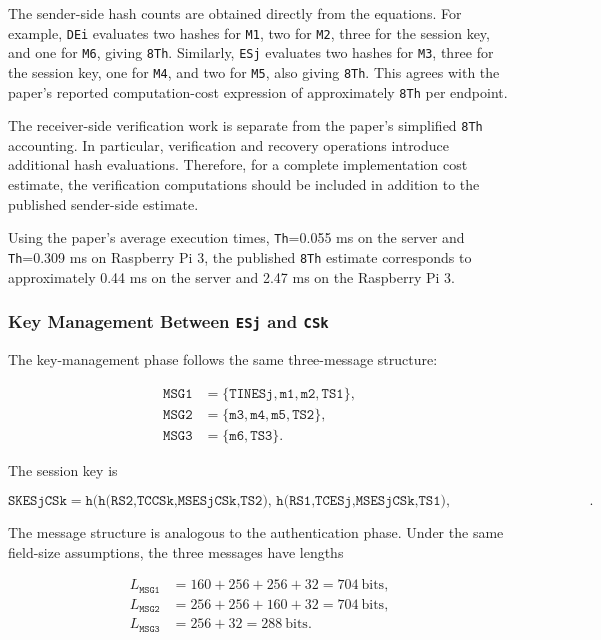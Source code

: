 The sender-side hash counts are obtained directly from the equations. For
example, \texttt{DEi} evaluates two hashes for \texttt{M1}, two for
\texttt{M2}, three for the session key, and one for \texttt{M6}, giving
\texttt{8Th}. Similarly, \texttt{ESj} evaluates two hashes for \texttt{M3},
three for the session key, one for \texttt{M4}, and two for \texttt{M5}, also
giving \texttt{8Th}. This agrees with the paper's reported computation-cost
expression of approximately \texttt{8Th} per endpoint.

The receiver-side verification work is separate from the paper's simplified
\texttt{8Th} accounting. In particular, verification and recovery operations
introduce additional hash evaluations. Therefore, for a complete implementation
cost estimate, the verification computations should be included in addition to
the published sender-side estimate.

Using the paper's average execution times,
\texttt{Th}=0.055 ms on the server and \texttt{Th}=0.309 ms on Raspberry Pi 3,
the published \texttt{8Th} estimate corresponds to approximately
0.44 ms on the server and 2.47 ms on the Raspberry Pi 3.

\subsubsection{Key Management Between \texttt{ESj} and \texttt{CSk}}

The key-management phase follows the same three-message structure:

\begin{align}
\texttt{MSG1} &= \{\texttt{TINESj},\texttt{m1},\texttt{m2},\texttt{TS1}\},\\
\texttt{MSG2} &= \{\texttt{m3},\texttt{m4},\texttt{m5},\texttt{TS2}\},\\
\texttt{MSG3} &= \{\texttt{m6},\texttt{TS3}\}.
\end{align}

The session key is

\begin{equation}
\texttt{SKESjCSk} =
\texttt{h(h(RS2,TCCSk,MSESjCSk,TS2),
h(RS1,TCESj,MSESjCSk,TS1),
RIDESj,MSESjCSk,TS1,TS2)}.
\end{equation}

The message structure is analogous to the authentication phase. Under the same
field-size assumptions, the three messages have lengths

\begin{align}
L_{\texttt{MSG1}} &=160+256+256+32=704~\text{bits},\\
L_{\texttt{MSG2}} &=256+256+160+32=704~\text{bits},\\
L_{\texttt{MSG3}} &=256+32=288~\text{bits}.
\end{align}

